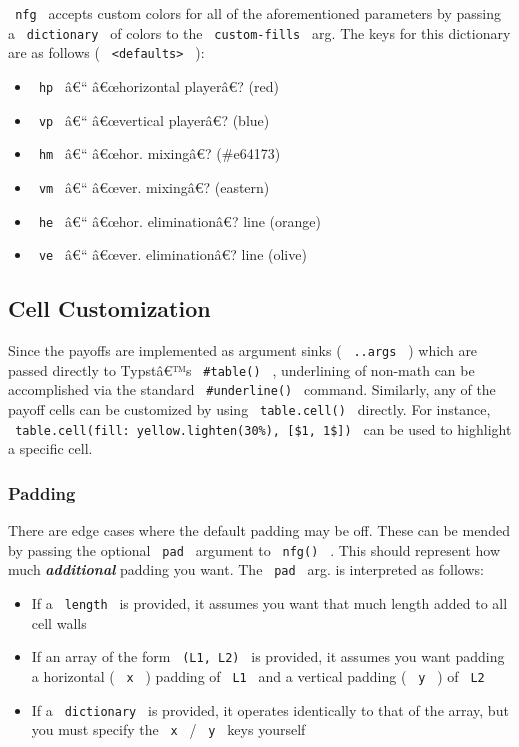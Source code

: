 \texttt{\ nfg\ } accepts custom colors for all of the aforementioned
parameters by passing a \texttt{\ dictionary\ } of colors to the
\texttt{\ custom-fills\ } arg. The keys for this dictionary are as
follows ( \texttt{\ \textless{}defaults\textgreater{}\ } ):

\begin{itemize}
\tightlist
\item
  \texttt{\ hp\ } â€`` â€œhorizontal playerâ€? (red)
\item
  \texttt{\ vp\ } â€`` â€œvertical playerâ€? (blue)
\item
  \texttt{\ hm\ } â€`` â€œhor. mixingâ€? (\#e64173)
\item
  \texttt{\ vm\ } â€`` â€œver. mixingâ€? (eastern)
\item
  \texttt{\ he\ } â€`` â€œhor. eliminationâ€? line (orange)
\item
  \texttt{\ ve\ } â€`` â€œver. eliminationâ€? line (olive)
\end{itemize}

\subsection{Cell Customization}\label{cell-customization}

Since the payoffs are implemented as argument sinks (
\texttt{\ ..args\ } ) which are passed directly to Typstâ€™s
\texttt{\ \#table()\ } , underlining of non-math can be accomplished via
the standard \texttt{\ \#underline()\ } command. Similarly, any of the
payoff cells can be customized by using \texttt{\ table.cell()\ }
directly. For instance,
\texttt{\ table.cell(fill:\ yellow.lighten(30\%),\ {[}\$1,\ 1\${]})\ }
can be used to highlight a specific cell.

\subsubsection{Padding}\label{padding}

There are edge cases where the default padding may be off. These can be
mended by passing the optional \texttt{\ pad\ } argument to
\texttt{\ nfg()\ } . This should represent how much
\textbf{\emph{additional}} padding you want. The \texttt{\ pad\ } arg.
is interpreted as follows:

\begin{itemize}
\tightlist
\item
  If a \texttt{\ length\ } is provided, it assumes you want that much
  length added to all cell walls
\item
  If an array of the form \texttt{\ (L1,\ L2)\ } is provided, it assumes
  you want padding a horizontal ( \texttt{\ x\ } ) padding of
  \texttt{\ L1\ } and a vertical padding ( \texttt{\ y\ } ) of
  \texttt{\ L2\ }
\item
  If a \texttt{\ dictionary\ } is provided, it operates identically to
  that of the array, but you must specify the \texttt{\ x\ } /
  \texttt{\ y\ } keys yourself
\end{itemize}

